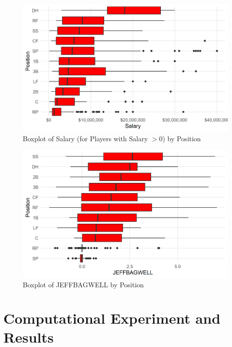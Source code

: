 \documentclass{article}
\begin{document}
\begin{figure}[h]
\caption{Boxplot of Salary (for Players with Salary $> 0$) by Position}
\label{fig:salary_position_boxplot}
\centering
\includegraphics[width=0.7\paperwidth, scale=1.25]{salary_position_boxplots.png}
\end{figure}

\begin{figure}[h]
\caption{Boxplot of JEFFBAGWELL by Position}
\label{fig:salary_war_boxplot}
\centering
\includegraphics[width=0.7\paperwidth, scale=1.25]{war_position_boxplots.png}
\end{figure}

\section{Computational Experiment and Results}
\end{document}
